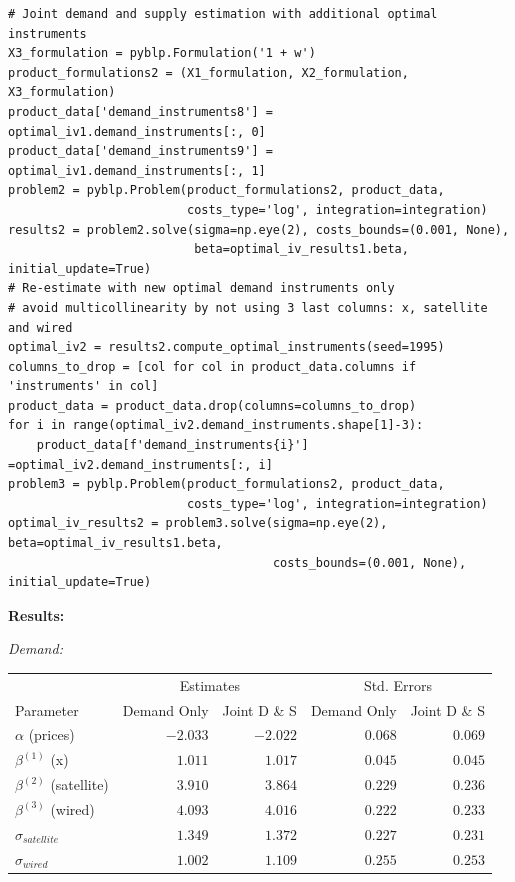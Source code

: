 \documentclass[english,11pt]{article}
\begin{document}
\begin{enumerate}
\begin{verbatim}
# Joint demand and supply estimation with additional optimal instruments 
X3_formulation = pyblp.Formulation('1 + w')
product_formulations2 = (X1_formulation, X2_formulation, X3_formulation)
product_data['demand_instruments8'] = optimal_iv1.demand_instruments[:, 0]
product_data['demand_instruments9'] = optimal_iv1.demand_instruments[:, 1]
problem2 = pyblp.Problem(product_formulations2, product_data, 
                         costs_type='log', integration=integration)
results2 = problem2.solve(sigma=np.eye(2), costs_bounds=(0.001, None), 
                          beta=optimal_iv_results1.beta, initial_update=True)
# Re-estimate with new optimal demand instruments only
# avoid multicollinearity by not using 3 last columns: x, satellite and wired
optimal_iv2 = results2.compute_optimal_instruments(seed=1995)
columns_to_drop = [col for col in product_data.columns if 'instruments' in col]
product_data = product_data.drop(columns=columns_to_drop)
for i in range(optimal_iv2.demand_instruments.shape[1]-3): 
    product_data[f'demand_instruments{i}'] =optimal_iv2.demand_instruments[:, i]
problem3 = pyblp.Problem(product_formulations2, product_data, 
                         costs_type='log', integration=integration)
optimal_iv_results2 = problem3.solve(sigma=np.eye(2), beta=optimal_iv_results1.beta,
                                     costs_bounds=(0.001, None), initial_update=True)
\end{verbatim}

\textbf{Results:}

\textit{Demand:}

\begin{center}
\begin{tabular}{lrrrr}
\hline
 & \multicolumn{2}{c}{Estimates} & \multicolumn{2}{c}{Std. Errors} \\
Parameter & Demand Only & Joint D \& S & Demand Only & Joint D \& S \\
\hline
$\alpha$ (prices) & $-2.033$ & $-2.022$ & $0.068$ & $0.069$ \\
$\beta^{(1)}$ (x) & $1.011$ & $1.017$ & $0.045$ & $0.045$ \\
$\beta^{(2)}$ (satellite) & $3.910$ & $3.864$ & $0.229$ & $0.236$ \\
$\beta^{(3)}$ (wired) & $4.093$ & $4.016$ & $0.222$ & $0.233$ \\
\hline
$\sigma_{satellite}$ & $1.349$ & $1.372$ & $0.227$ & $0.231$ \\
$\sigma_{wired}$ & $1.002$ & $1.109$ & $0.255$ & $0.253$ \\
\hline
\end{tabular}
\end{center}


\end{enumerate}
\end{document}
